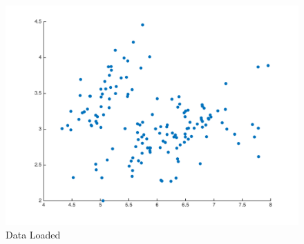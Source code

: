 \documentclass[a4paper, 11pt]{article}
\begin{document}
\begin{figure}
\centering
\includegraphics[scale=0.50]{scatter.png}
\caption[]{Data Loaded}
\label{fig:sctr}
\end{figure}
\end{document}

